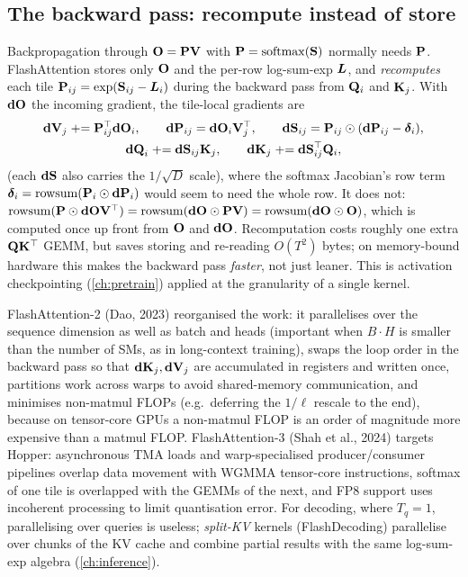 \subsection{The backward pass: recompute instead of store}
Backpropagation through $\mathbf{O}=\mathbf{P}\mathbf{V}$ with $\mathbf{P}=\operatorname{softmax}(\mathbf{S})$ normally needs $\mathbf{P}$.
FlashAttention stores only $\mathbf{O}$ and the per-row log-sum-exp $\bm{L}$, and \emph{recomputes}
each tile $\mathbf{P}_{ij}=\exp(\mathbf{S}_{ij}-\bm{L}_i)$ during the backward pass from $\mathbf{Q}_i$ and
$\mathbf{K}_j$. With $\mathbf{dO}$ the incoming gradient, the tile-local gradients are
\begin{gather}
\mathbf{dV}_j \mathrel{+}= \mathbf{P}_{ij}^\top\mathbf{dO}_i,\qquad
\mathbf{dP}_{ij}=\mathbf{dO}_i\mathbf{V}_j^\top,\qquad
\mathbf{dS}_{ij}=\mathbf{P}_{ij}\odot(\mathbf{dP}_{ij}-\bm{\delta}_i),\\
\mathbf{dQ}_i \mathrel{+}= \mathbf{dS}_{ij}\mathbf{K}_j,\qquad
\mathbf{dK}_j \mathrel{+}= \mathbf{dS}_{ij}^\top\mathbf{Q}_i ,
\end{gather}
(each $\mathbf{dS}$ also carries the $1/\sqrt{D}$ scale), where the softmax Jacobian's row term
$\bm{\delta}_i=\operatorname{rowsum}(\mathbf{P}_i\odot\mathbf{dP}_i)$ would seem to need the whole row. It
does not: $\operatorname{rowsum}(\mathbf{P}\odot\mathbf{dO}\mathbf{V}^\top)=\operatorname{rowsum}(\mathbf{dO}\odot\mathbf{P}\mathbf{V})=\operatorname{rowsum}(\mathbf{dO}\odot\mathbf{O})$,
which is computed once up front from $\mathbf{O}$ and $\mathbf{dO}$. Recomputation costs roughly one extra
$\mathbf{Q}\mathbf{K}^\top$ GEMM, but saves storing and re-reading $O(T^2)$ bytes; on memory-bound hardware this
makes the backward pass \emph{faster}, not just leaner. This is activation checkpointing
(\cref{ch:pretrain}) applied at the granularity of a single kernel.

\begin{systemslens}
FlashAttention-2 (Dao, 2023) reorganised the work: it parallelises over the sequence dimension as
well as batch and heads (important when $B\cdot H$ is smaller than the number of SMs, as in
long-context training), swaps the loop order in the backward pass so that $\mathbf{dK}_j,\mathbf{dV}_j$ are
accumulated in registers and written once, partitions work across warps to avoid shared-memory
communication, and minimises non-matmul FLOPs (e.g.\ deferring the $1/\ell$ rescale to the end),
because on tensor-core GPUs a non-matmul FLOP is an order of magnitude more expensive than a matmul
FLOP. FlashAttention-3 (Shah et al., 2024) targets Hopper: asynchronous TMA loads and
warp-specialised producer/consumer pipelines overlap data movement with WGMMA tensor-core
instructions, softmax of one tile is overlapped with the GEMMs of the next, and FP8 support uses
incoherent processing to limit quantisation error. For decoding, where $T_q=1$, parallelising over
queries is useless; \emph{split-KV} kernels (FlashDecoding) parallelise over chunks of the KV cache
and combine partial results with the same log-sum-exp algebra (\cref{ch:inference}).
\end{systemslens}

